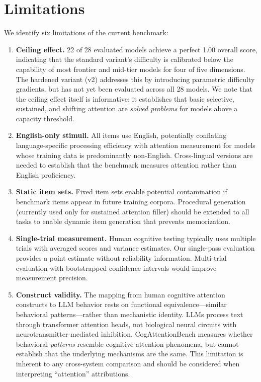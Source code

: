 \documentclass{article}
\begin{document}
\section{Limitations}
\label{sec:limitations}

We identify six limitations of the current benchmark:

\begin{enumerate}
    \item \textbf{Ceiling effect.} 22 of 28 evaluated models achieve a perfect 1.00 overall score, indicating that the standard variant's difficulty is calibrated below the capability of most frontier and mid-tier models for four of five dimensions. The hardened variant (v2) addresses this by introducing parametric difficulty gradients, but has not yet been evaluated across all 28 models. We note that the ceiling effect itself is informative: it establishes that basic selective, sustained, and shifting attention are \emph{solved problems} for models above a capacity threshold.
    \item \textbf{English-only stimuli.} All items use English, potentially conflating language-specific processing efficiency with attention measurement for models whose training data is predominantly non-English. Cross-lingual versions are needed to establish that the benchmark measures attention rather than English proficiency.
    \item \textbf{Static item sets.} Fixed item sets enable potential contamination if benchmark items appear in future training corpora. Procedural generation (currently used only for sustained attention filler) should be extended to all tasks to enable dynamic item generation that prevents memorization.
    \item \textbf{Single-trial measurement.} Human cognitive testing typically uses multiple trials with averaged scores and variance estimates. Our single-pass evaluation provides a point estimate without reliability information. Multi-trial evaluation with bootstrapped confidence intervals would improve measurement precision.
    \item \textbf{Construct validity.} The mapping from human cognitive attention constructs to LLM behavior rests on functional equivalence---similar behavioral patterns---rather than mechanistic identity. LLMs process text through transformer attention heads, not biological neural circuits with neurotransmitter-mediated inhibition. CogAttentionBench measures whether behavioral \emph{patterns} resemble cognitive attention phenomena, but cannot establish that the underlying mechanisms are the same. This limitation is inherent to any cross-system comparison and should be considered when interpreting ``attention'' attributions.

\end{enumerate}
\end{document}
